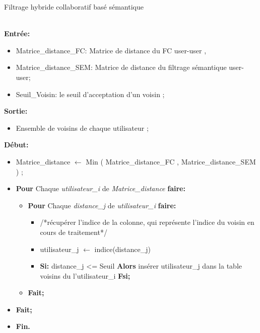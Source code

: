 \begin{algorithm}[H]
	\caption{Filtrage hybride collaboratif basé sémantique}
	\hspace*{\algorithmicindent} \\
	\hspace*{\algorithmicindent} \textbf{Entrée:} \begin{itemize}
		\item [] Matrice{\_}distance{\_}FC: Matrice de distance du FC user-user , 
		\item [] Matrice{\_}distance{\_}SEM: Matrice de distance du filtrage sémantique user-user;
		\item []  Seuil{\_}Voisin: le seuil d'acceptation d'un voisin ;
	\end{itemize}
	\hspace*{\algorithmicindent} \textbf{Sortie:} 
	\begin{itemize}
		\item [] Ensemble de voisins de chaque utilisateur ;
	\end{itemize}
	
	\hspace*{\algorithmicindent}\textbf{ Début:}


	
	\begin{itemize}
	\item []	Matrice{\_}distance $\leftarrow$ Min ( Matrice{\_}distance{\_}FC , Matrice{\_}distance{\_}SEM ) ;
		
		\item [] \textbf{Pour} Chaque \textit{utilisateur{\_}i} de \textit{ Matrice{\_}distance} \textbf{faire:}
				
		\begin{itemize}
			\item [] \textbf{Pour} Chaque \textit{distance{\_}j} de \textit{utilisateur{\_}i} \textbf{faire:} 
			\begin{itemize}
				\item [] /*récupérer l'indice de la colonne, qui représente l'indice du voisin en cours de traitement*/
				\item [] utilisateur{\_}j  $\leftarrow$ indice(distance{\_}j) 

				\item [] \textbf{Si:} distance{\_}j  <= Seuil \textbf{Alors} insérer utilisateur{\_}j  dans la table voisins du l'utilisateur{\_}i \textbf{Fsi;}
			\end{itemize}
			
			\item []  \textbf{Fait;}
		\end{itemize}
	\item []  \textbf{Fait;}
	\item [] \textbf{ Fin.}
	\end{itemize}
	

\end{algorithm} 

